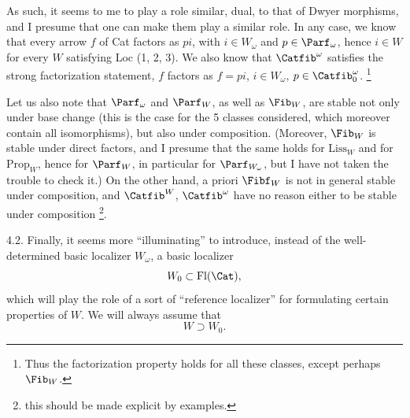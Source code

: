 As such, it seems to me to play a role similar, dual, to that of Dwyer morphisms, and I presume that one can make them play a similar role. In any  case, we know that every arrow $f$ of Cat factors as $pi$, with $i \in W_\omega$ and $p \in \Parf_\omega$, hence $i \in W$ for every $W$ satisfying Loc (1, 2, 3). We also know that $\Catfib^\omega$ satisfies the strong factorization statement, $f$ factors as $f = pi$, $i \in W_\omega$, $p \in \Catfib_0^\omega$. \footnote[21]{Thus the factorization property holds for all these classes, except perhaps $\Fib_W$.}

Let us also note that $\Parf_\omega$ and $\Parf_W$, as well as $\Fib_W$, are stable not only under base change (this is the case for the 5 classes considered, which moreover contain all isomorphisms), but also under composition. (Moreover, $\Fib_W$ is stable under direct factors, and I presume that the same holds for $\mathrm{Liss}_W$ and for $\mathrm{Prop}_W$, hence for $\Parf_W$, in particular for $\Parf_{W_\omega}$, but I have not taken the trouble to check it.) On the other hand, a priori $\Fibf_W$ is not in general stable under composition, and $\Catfib^W$, $\Catfib^\omega$ have no reason
either to be stable under composition \footnote[22]{this should be made explicit by examples.}.

4.2. Finally, it seems more ``illuminating'' to introduce, instead of the well-determined basic localizer $W_\omega$, a basic localizer %
\[
W_0 \subset \mathrm{Fl}(\Cat),
\]
which will play the role of a sort of ``reference localizer'' for formulating certain properties of $W$. We will always assume that
\[
W \supset W_0.
\]


